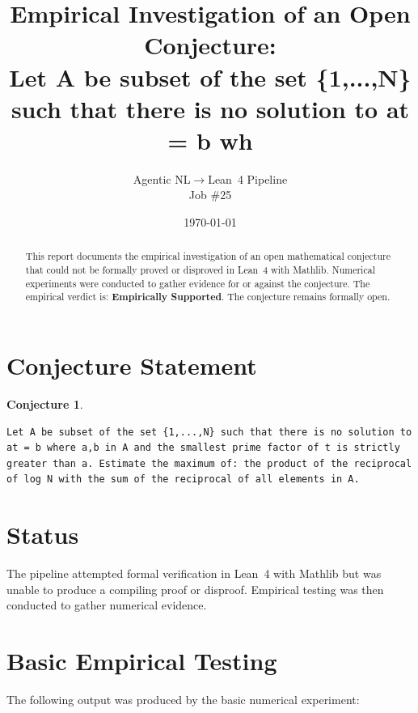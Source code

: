 \documentclass[11pt]{article}
\title{Empirical Investigation of an Open Conjecture:\\
Let A be subset of the set \{1,...,N\} such that there is no solution to at = b wh}
\author{Agentic NL$\to$Lean~4 Pipeline \\ \small Job \#25}
\date{\today}
\newtheorem{conjecture}{Conjecture}
\begin{document}
\maketitle

\begin{abstract}
This report documents the empirical investigation of an open mathematical conjecture
that could not be formally proved or disproved in Lean~4 with Mathlib.
Numerical experiments were conducted to gather evidence for or against the conjecture.
The empirical verdict is: \textbf{\textcolor{green!70!black}{Empirically Supported}}.
The conjecture remains formally open.
\end{abstract}

\section{Conjecture Statement}

\begin{conjecture}
\begin{lstlisting}
Let A be subset of the set {1,...,N} such that there is no solution to at = b where a,b in A and the smallest prime factor of t is strictly greater than a. Estimate the maximum of: the product of the reciprocal of log N with the sum of the reciprocal of all elements in A.
\end{lstlisting}
\end{conjecture}

\section{Status}

\begin{center}
\end{center}

The pipeline attempted formal verification in Lean~4 with Mathlib but was unable to
produce a compiling proof or disproof. Empirical testing was then conducted to gather
numerical evidence.

\section{Basic Empirical Testing}

The following output was produced by the basic numerical experiment:
\end{document}

